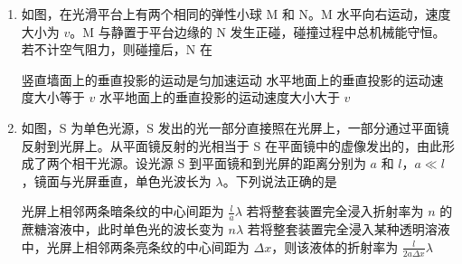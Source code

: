 \documentclass[\gkver]{gaokaozhenti}
\begin{document}
\begin{enumerate}
{带负电的小圆环在两个负点电荷电场中的电势能

$E_{p} = \frac{64kQq}{2R\sin\alpha} + \frac{27kQq}{2R\cos\alpha}$

根据数学知识可知在 $37^{\circ} \leqslant \alpha \leqslant 53^{\circ}$ 范围内，随着 $\alpha$ 的增大，小圆环的电势能一直减小，所以静电力做正功。

故选 A。
}

\item
如图，在光滑平台上有两个相同的弹性小球 M 和 N。M 水平向右运动，速度大小为 $v$。M 与静置于平台边缘的 N 发生正碰，碰撞过程中总机械能守恒。若不计空气阻力，则碰撞后，N 在


{竖直墙面上的垂直投影的运动是匀加速运动}
{水平地面上的垂直投影的运动速度大小等于 $v$}
{水平地面上的垂直投影的运动速度大小大于 $v$}


\item
如图，S 为单色光源，S 发出的光一部分直接照在光屏上，一部分通过平面镜反射到光屏上。从平面镜反射的光相当于 S 在平面镜中的虚像发出的，由此形成了两个相干光源。设光源 S 到平面镜和到光屏的距离分别为 $a$ 和 $l$，$a \ll l$，镜面与光屏垂直，单色光波长为 $\lambda$。下列说法正确的是


{光屏上相邻两条暗条纹的中心间距为 $\frac{l}{a}\lambda$}
{若将整套装置完全浸入折射率为 $n$ 的蔗糖溶液中，此时单色光的波长变为 $n\lambda$}
{若将整套装置完全浸入某种透明溶液中，光屏上相邻两条亮条纹的中心间距为 $\Delta x$，则该液体的折射率为 $\frac{l}{2a\Delta x}\lambda$}


\end{enumerate}
\end{document}

